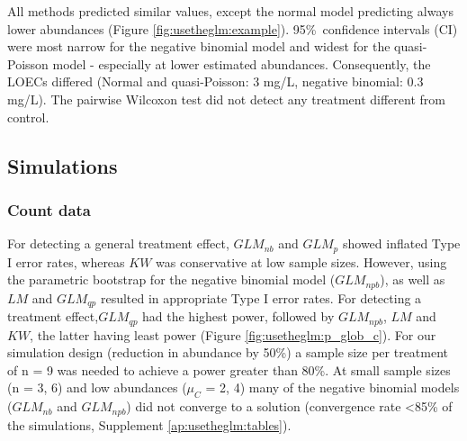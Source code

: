All methods predicted similar values, except the normal model predicting always lower abundances (Figure \ref{fig:usetheglm:example}). 
95\%~confidence intervals (CI) were most narrow for the negative binomial model and widest for the quasi-Poisson model - especially at lower estimated abundances.
Consequently, the LOECs differed (Normal and quasi-Poisson: 3 mg/L, negative binomial: 0.3 mg/L).
The pairwise Wilcoxon test did not detect any treatment different from control.


\subsection{Simulations}
\subsubsection{Count data}
For detecting a general treatment effect, $GLM_{nb}$ and $GLM_{p}$ showed inflated Type I error rates, whereas $KW$ was conservative at low sample sizes.
However, using the parametric bootstrap for the negative binomial model ($GLM_{npb}$), as well as $LM$ and $GLM_{qp}$ resulted in appropriate Type I error rates.
For detecting a treatment effect,$GLM_{qp}$ had the highest power, followed by $GLM_{npb}$, $LM$ and $KW$, the latter having least power (Figure \ref{fig:usetheglm:p_glob_c}).
For our simulation design (reduction in abundance by 50\%) a sample size per treatment of n = 9 was needed to achieve a power greater than 80\%.
At small sample sizes (n = {3, 6}) and low abundances ($\mu_C$ = {2, 4}) many of the negative binomial models ($GLM_{nb}$ and $GLM_{npb}$) did not converge to a solution (convergence rate \textless 85\% of the simulations, Supplement  \ref{ap:usetheglm:tables}). 


